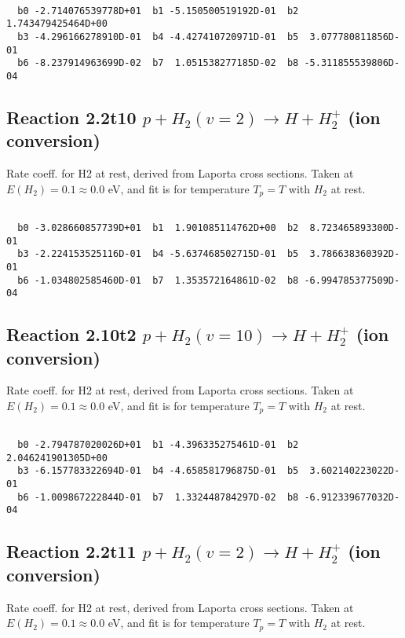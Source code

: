 \begin{small}\begin{verbatim}

  b0 -2.714076539778D+01  b1 -5.150500519192D-01  b2  1.743479425464D+00
  b3 -4.296166278910D-01  b4 -4.427410720971D-01  b5  3.077780811856D-01
  b6 -8.237914963699D-02  b7  1.051538277185D-02  b8 -5.311855539806D-04

\end{verbatim}\end{small}

\newpage
\subsection{
Reaction 2.2t10
$ p + H_2(v=2) \rightarrow H + H_2^+$ (ion conversion)
}
Rate coeff. for H2 at rest, derived from Laporta cross sections.
Taken at $E(H_2) = 0.1 \approx 0.0$ eV,  and fit is for temperature $T_p=T$ with $H_2$ at rest.

\begin{small}\begin{verbatim}

  b0 -3.028660857739D+01  b1  1.901085114762D+00  b2  8.723465893300D-01
  b3 -2.224153525116D-01  b4 -5.637468502715D-01  b5  3.786638360392D-01
  b6 -1.034802585460D-01  b7  1.353572164861D-02  b8 -6.994785377509D-04

\end{verbatim}\end{small}

\newpage
\subsection{
Reaction 2.10t2
$ p + H_2(v=10) \rightarrow H + H_2^+$ (ion conversion)
}
Rate coeff. for H2 at rest, derived from Laporta cross sections.
Taken at $E(H_2) = 0.1 \approx 0.0$ eV,  and fit is for temperature $T_p=T$ with $H_2$ at rest.

\begin{small}\begin{verbatim}

  b0 -2.794787020026D+01  b1 -4.396335275461D-01  b2  2.046241901305D+00
  b3 -6.157783322694D-01  b4 -4.658581796875D-01  b5  3.602140223022D-01
  b6 -1.009867222844D-01  b7  1.332448784297D-02  b8 -6.912339677032D-04

\end{verbatim}\end{small}

\newpage
\subsection{
Reaction 2.2t11
$ p + H_2(v=2) \rightarrow H + H_2^+$ (ion conversion)
}
Rate coeff. for H2 at rest, derived from Laporta cross sections.
Taken at $E(H_2) = 0.1 \approx 0.0$ eV,  and fit is for temperature $T_p=T$ with $H_2$ at rest.

